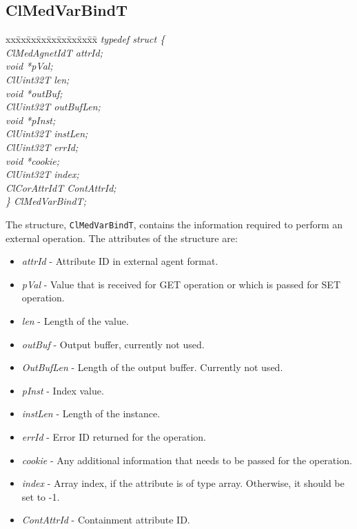 \begin{flushleft}
\subsection{ClMedVarBindT}
\begin{tabbing}
xx\=xx\=xx\=xx\=xx\=xx\=xx\=xx\=xx\=\kill
\textit{typedef struct \{}\\
\>\>\>\>\textit{ClMedAgnetIdT      attrId;}\\
\>\>\>\>\textit{void     *pVal;}\\
\>\>\>\>\textit{ClUint32T     len;}\\
\>\>\>\>\textit{void     *outBuf;}\\
\>\>\>\>\textit{ClUint32T     outBufLen;}\\
\>\>\>\>\textit{void     *pInst;}\\
\>\>\>\>\textit{ClUint32T     instLen;}\\
\>\>\>\>\textit{ClUint32T     errId;}\\
\>\>\>\>\textit{void     *cookie;}\\
\>\>\>\>\textit{ClUint32T index;}\\
\>\>\>\>\textit{ClCorAttrIdT     ContAttrId;}\\
\textit{\} ClMedVarBindT;}\end{tabbing}
The structure, {\tt{ClMedVarBindT}}, contains the information required to perform an external operation. The attributes of the structure are:
\begin{itemize}
\item
\textit{attrId} - Attribute ID in external agent format.
\item
\textit{pVal} - Value that is received for GET operation or which is passed for SET operation.
\item
\textit{len} - Length of the value.
\item
\textit{outBuf} - Output buffer, currently not used.
\item
\textit{OutBufLen} - Length of the output buffer. Currently not used.
\item
\textit{pInst} - Index value.
\item
\textit{instLen} - Length of the instance.
\item
\textit{errId} - Error ID returned for the operation.
\item
\textit{cookie} - Any additional information that needs to be passed for the operation.
\item
\textit{index} - Array index, if the attribute is of type array. Otherwise, it should be set to -1.
\item
\textit{ContAttrId} - Containment attribute ID.
\end{itemize}





\end{flushleft}
